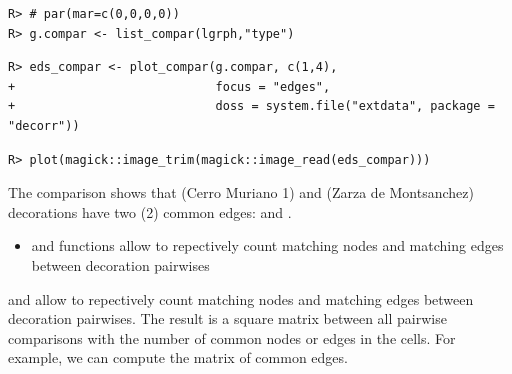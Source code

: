 \documentclass[article]{jss}\usepackage{knitr}
\begin{document}
\begin{kframe}
\begin{verbatim}
R> # par(mar=c(0,0,0,0))
R> g.compar <- list_compar(lgrph,"type")
\end{verbatim}


{\ttfamily\noindent\bfseries\color{errorcolor}{\#\# Error in utils::combn(1:length(lgrph), 2): object 'lgrph' not found}}\begin{verbatim}
R> eds_compar <- plot_compar(g.compar, c(1,4),
+                            focus = "edges",
+                            doss = system.file("extdata", package = "decorr"))
\end{verbatim}


{\ttfamily\noindent\bfseries{}}\begin{verbatim}
R> plot(magick::image_trim(magick::image_read(eds_compar)))
\end{verbatim}


{\ttfamily\noindent\bfseries\color{errorcolor}{\#\# Error in magick::image\_read(eds\_compar): path must be URL, filename or raw vector}}\end{kframe}

The comparison shows that  (Cerro Muriano 1) and  (Zarza de Montsanchez) decorations have two (2) common edges:  and .

\begin{itemize}
\setlength\itemsep{.1em}
  \item {} and  functions allow to repectively count matching nodes and matching edges between decoration pairwises
\end{itemize}

 and  allow to repectively count matching nodes and matching edges between decoration pairwises. The result is a square matrix between all pairwise comparisons with the number of common nodes or edges in the cells. For example, we can compute the matrix of common edges.
\end{document}
